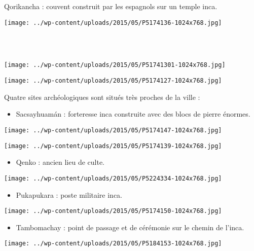 Qorikancha : couvent construit par les espagnols sur un temple inca. 
\begin{center} \texttt{[image: ../wp-content/uploads/2015/05/P5174136-1024x768.jpg]} \end{center}
\vspace{-\topsep}
\pagebreak
~\\
~\\
\vspace{-0.25mm}
\begin{center} \texttt{[image: ../wp-content/uploads/2015/05/P51741301-1024x768.jpg]} \end{center}
\begin{center} \texttt{[image: ../wp-content/uploads/2015/05/P5174127-1024x768.jpg]} \end{center}
\vspace{-\topsep}
\vspace{-2.5mm}
\pagebreak

Quatre sites archéologiques sont situés très proches de la ville : 
\begin{itemize}
\item Sacsayhuamán : forteresse inca construite avec des blocs de pierre énormes. 
\end{itemize}
\vspace{-\topsep}
\begin{center} \texttt{[image: ../wp-content/uploads/2015/05/P5174147-1024x768.jpg]} \end{center}
\begin{center} \texttt{[image: ../wp-content/uploads/2015/05/P5174139-1024x768.jpg]} \end{center}
\vspace{-\topsep}
\vspace{-2.75mm}
\pagebreak
\begin{itemize}
\item Qenko : ancien lieu de culte.
\end{itemize}
\vspace{2mm}
\begin{center} \texttt{[image: ../wp-content/uploads/2015/05/P5224334-1024x768.jpg]} \end{center}
\begin{itemize}
\item Pukapukara : poste militaire inca. 
\end{itemize}
\begin{center} \texttt{[image: ../wp-content/uploads/2015/05/P5174150-1024x768.jpg]} \end{center}
\vspace{-\topsep}
\vspace{-1.5mm}
\pagebreak
\begin{itemize}
\item Tambomachay : point de passage et de cérémonie sur le chemin de l'inca. 
\end{itemize}
\begin{center} \texttt{[image: ../wp-content/uploads/2015/05/P5184153-1024x768.jpg]} \end{center}

